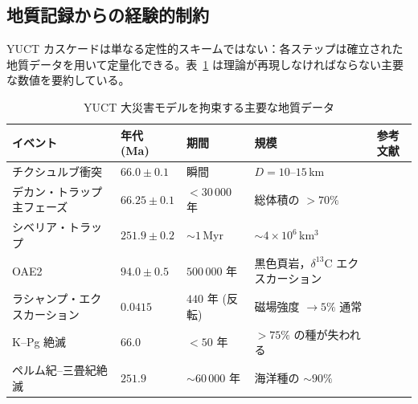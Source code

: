 \documentclass[12pt,a4paper]{article}
\begin{document}
	\subsection{地質記録からの経験的制約}
	YUCT カスケードは単なる定性的スキームではない：各ステップは確立された地質データを用いて定量化できる。表~\ref{tab:geodata} は理論が再現しなければならない主要な数値を要約している。
	
	\begin{table}[H]
		\centering
		\small
		\caption{YUCT 大災害モデルを拘束する主要な地質データ}
		\label{tab:geodata}
		\begin{tabular}{@{}p{4.2cm} p{2.6cm} p{2.8cm} p{4.2cm} p{1.2cm}@{}}
			\toprule
			\textbf{イベント} & \textbf{年代 (Ma)} & \textbf{期間} & \textbf{規模} & \textbf{参考文献} \\
			\midrule
			チクシュルブ衝突 & \(66.0 \pm 0.1\) & 瞬間 & \(D = 10\)–\(15\) km & \cite{Schulte2010} \\
			デカン・トラップ主フェーズ & \(66.25 \pm 0.1\) & \(<30\,000\) 年 & 総体積の \(>70\%\) & \cite{Schoene2019} \\
			シベリア・トラップ & \(251.9 \pm 0.2\) & \(\sim 1\) Myr & \(\sim 4\times10^6\) km\(^3\) & \cite{SiberianTraps} \\
			OAE2 & \(94.0 \pm 0.5\) & \(500\,000\) 年 & 黒色頁岩，\(\delta^{13}\)C エクスカーション & \cite{Jenkyns2010} \\
			ラシャンプ・エクスカーション & \(0.0415\) & \(440\) 年 (反転) & 磁場強度 \(\to 5\%\) 通常 & \cite{Laschamp} \\
			K–Pg 絶滅 & \(66.0\) & \(<50\) 年 & \(>75\%\) の種が失われる & \cite{Schulte2010} \\
			ペルム紀–三畳紀絶滅 & \(251.9\) & \(\sim 60\,000\) 年 & 海洋種の \(\sim 90\%\) & \cite{Burgess2014} \\
			\bottomrule
		\end{tabular}
	\end{table}
	
\end{document}
